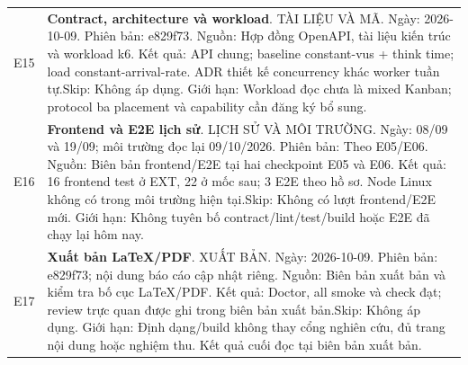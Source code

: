 \begin{longtable}{@{}P{.11\textwidth}P{.79\textwidth}@{}}
\label{ev:E15}E15 & \textbf{Contract, architecture và workload}. TÀI LIỆU VÀ MÃ. \newline Ngày: 2026-10-09. Phiên bản: e829f73. \newline Nguồn: Hợp đồng OpenAPI, tài liệu kiến trúc và workload k6. \newline Kết quả: API chung; baseline constant-vus + think time; load constant-arrival-rate. ADR thiết kế concurrency khác worker tuần tự.\newline Skip: Không áp dụng. \newline Giới hạn: Workload đọc chưa là mixed Kanban; protocol ba placement và capability cần đăng ký bổ sung. \\
\label{ev:E16}E16 & \textbf{Frontend và E2E lịch sử}. LỊCH SỬ VÀ MÔI TRƯỜNG. \newline Ngày: 08\slash 09 và 19\slash 09; môi trường đọc lại 09\slash 10\slash 2026. Phiên bản: Theo E05\slash E06. \newline Nguồn: Biên bản frontend/E2E tại hai checkpoint E05 và E06. \newline Kết quả: 16 frontend test ở EXT, 22 ở mốc sau; 3 E2E theo hồ sơ. Node Linux không có trong môi trường hiện tại.\newline Skip: Không có lượt frontend\slash E2E mới. \newline Giới hạn: Không tuyên bố contract\slash lint\slash test\slash build hoặc E2E đã chạy lại hôm nay. \\
\label{ev:E17}E17 & \textbf{Xuất bản LaTeX\slash PDF}. XUẤT BẢN. \newline Ngày: 2026-10-09. Phiên bản: e829f73; nội dung báo cáo cập nhật riêng. \newline Nguồn: Biên bản xuất bản và kiểm tra bố cục LaTeX/PDF. \newline Kết quả: Doctor, all smoke và check đạt; review trực quan được ghi trong biên bản xuất bản.\newline Skip: Không áp dụng. \newline Giới hạn: Định dạng\slash build không thay cổng nghiên cứu, đủ trang nội dung hoặc nghiệm thu. Kết quả cuối đọc tại biên bản xuất bản. \\
\bottomrule\end{longtable}
